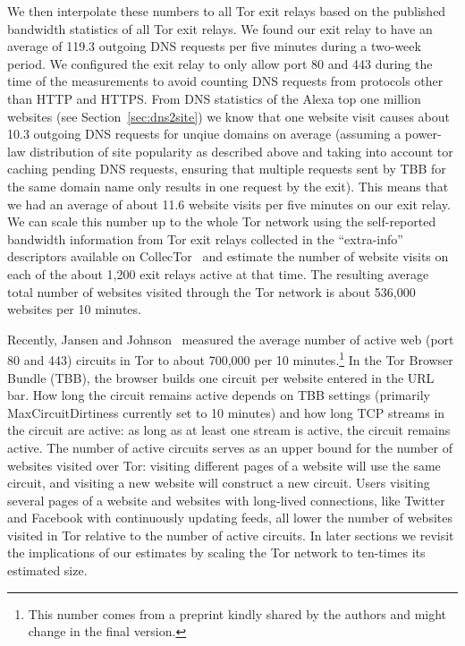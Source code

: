 We then interpolate these numbers to all Tor exit relays based on the published
bandwidth statistics of all Tor exit relays. We found our exit relay to have an
average of 119.3 outgoing DNS requests per five minutes during a two-week period.
We configured the exit relay to only allow port 80 and 443 during the time
of the measurements to avoid counting DNS requests from protocols other than
HTTP and HTTPS.
From DNS statistics of the Alexa top one million websites (see
Section~\ref{sec:dns2site}) we know that one website visit causes about
10.3 outgoing DNS requests for unqiue domains on average
(assuming a power-law distribution of site popularity as described above and
taking into account tor caching pending DNS requests, ensuring that multiple
requests sent by TBB for the same domain name only results in one request
by the exit).
This means that we had an average of about 11.6 website visits per five
minutes on our exit relay. We can scale this number up to the whole Tor
network using the self-reported bandwidth information from Tor exit
relays collected in the ``extra-info'' descriptors available on
CollecTor~\cite{collector} and estimate the number of website visits on
each of the about 1,200 exit relays active at that time. The resulting average
total number of websites visited through the Tor network is about 536,000
websites per 10 minutes.

Recently, Jansen and Johnson~\cite{jansen-ccs2016} measured the average
number of active web (port 80 and 443) circuits in Tor to about 700,000 per 10
minutes.\footnote{This number comes from a preprint kindly
shared by the authors and might change in the final version.}
In the Tor Browser Bundle (TBB), the browser builds one circuit per
website entered in the URL bar. How long the circuit remains active depends on
TBB settings (primarily MaxCircuitDirtiness currently set to 10 minutes) and how
long TCP streams in the circuit are active: as long as at least one stream is
active, the circuit remains active. The number of active circuits serves as an
upper bound for the number of websites visited over Tor: visiting different
pages of a website will use the same circuit, and visiting a new website will
construct a new circuit. Users visiting several pages of a website and websites
with long-lived connections, like Twitter and Facebook with continuously
updating feeds,
all lower the number of websites visited in Tor relative to the number of active
circuits. In later sections we revisit the implications of our estimates by
scaling the Tor network to ten-times its estimated size.

